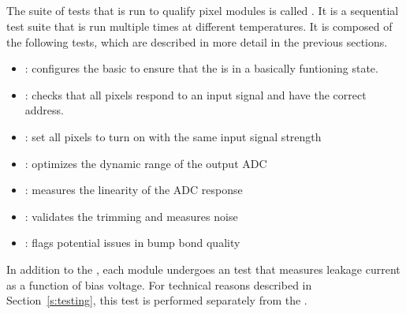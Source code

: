 \subsection{\fulltest}
\label{ss:fulltest}

The suite of tests that is run to qualify pixel modules is called
\fulltest. It is a sequential test suite that is run multiple times at
different temperatures. It is composed of the following tests, which
are described in more detail in the previous sections.
\begin{itemize}
  \item \pretest: configures the basic \dacs to ensure that the \roc is in a basically funtioning state.
  \item \alivetest: checks that all pixels respond to an input signal and have the correct address.
  \item \trimming: set all pixels to turn on with the same input signal strength
  \item \phopt: optimizes the dynamic range of the output ADC
  \item \gainped: measures the linearity of the ADC response
  \item \scurves: validates the trimming and measures noise
  \item \bb: flags potential issues in bump bond quality
\end{itemize}
In addition to the \fulltest, each module undergoes an \iv test that measures leakage current as a function of bias voltage.
For technical reasons described in Section~\ref{s:testing}, this test is performed separately from the \fulltest.
